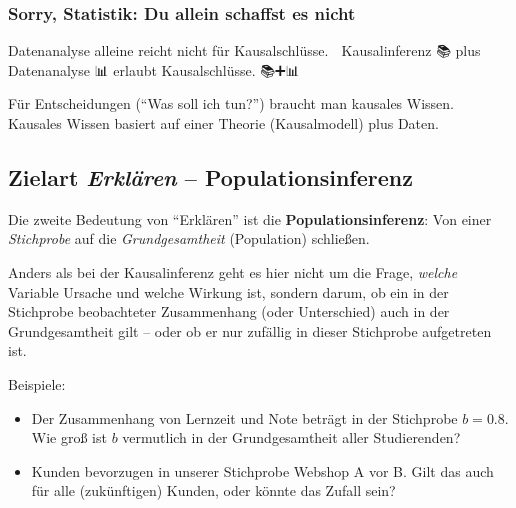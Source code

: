 \documentclass[
  ngerman,
  letterpaper,
  twoside,
  open=any]{scrbook}
\providecommand{\tightlist}{%
  \setlength{\itemsep}{0pt}\setlength{\parskip}{0pt}}\usepackage{longtable,booktabs,array}
\theoremstyle{definition}
\theoremstyle{plain}
\theoremstyle{definition}
\theoremstyle{definition}
\theoremstyle{definition}
\theoremstyle{definition}
\theoremstyle{remark}
\begin{document}
\subsubsection{Sorry, Statistik: Du allein schaffst es
nicht}\label{sorry-statistik-du-allein-schaffst-es-nicht}

Datenanalyse alleine reicht nicht für Kausalschlüsse. 🧟 Kausalinferenz
📚 plus Datenanalyse 📊 erlaubt Kausalschlüsse. 📚➕📊 🟰 🤩

\begin{tcolorbox}[enhanced jigsaw, arc=.35mm, bottomrule=.15mm, bottomtitle=1mm, breakable, colback=white, colbacktitle=quarto-callout-important-color!10!white, colframe=quarto-callout-important-color-frame, coltitle=black, left=2mm, leftrule=.75mm, opacityback=0, opacitybacktitle=0.6, rightrule=.15mm, title=\textcolor{quarto-callout-important-color}{\faExclamation}\hspace{0.5em}{Wichtig}, titlerule=0mm, toprule=.15mm, toptitle=1mm]

Für Entscheidungen (\enquote{Was soll ich tun?}) braucht man kausales
Wissen. Kausales Wissen basiert auf einer Theorie (Kausalmodell) plus
Daten.

\end{tcolorbox}

\subsection{\texorpdfstring{Zielart \emph{Erklären} --
Populationsinferenz}{Zielart Erklären -- Populationsinferenz}}\label{zielart-erkluxe4ren-populationsinferenz}

Die zweite Bedeutung von \enquote{Erklären} ist die
\textbf{Populationsinferenz}: Von einer \emph{Stichprobe} auf die
\emph{Grundgesamtheit} (Population) schließen.

Anders als bei der Kausalinferenz geht es hier nicht um die Frage,
\emph{welche} Variable Ursache und welche Wirkung ist, sondern darum, ob
ein in der Stichprobe beobachteter Zusammenhang (oder Unterschied) auch
in der Grundgesamtheit gilt -- oder ob er nur zufällig in dieser
Stichprobe aufgetreten ist.

Beispiele:

\begin{itemize}
\tightlist
\item
  Der Zusammenhang von Lernzeit und Note beträgt in der Stichprobe
  \(b = 0.8\). Wie groß ist \(b\) vermutlich in der Grundgesamtheit
  aller Studierenden?
\item
  Kunden bevorzugen in unserer Stichprobe Webshop A vor B. Gilt das auch
  für alle (zukünftigen) Kunden, oder könnte das Zufall sein?
\end{itemize}
\end{document}

